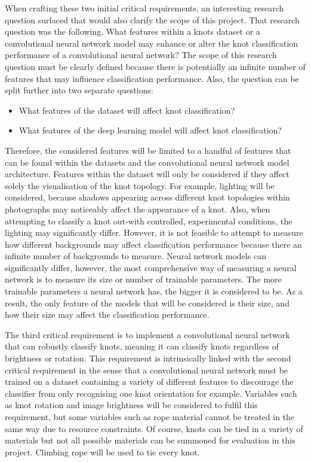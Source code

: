 \documentclass{l4proj}
\begin{document}
When crafting these two initial critical requirements, an interesting research question surfaced that would also clarify the scope of this project.
That research question was the following.
What features within a knots dataset or a convolutional neural network model may enhance or alter the knot classification performance of a convolutional neural network?
The scope of this research question must be clearly defined because there is potentially an infinite number of features that may influence classification performance.
Also, the question can be split further into two separate questions:
\begin{itemize}
	\item What features of the dataset will affect knot classification?
	\item What features of the deep learning model will affect knot classification?
\end{itemize}
Therefore, the considered features will be limited to a handful of features that can be found within the datasets and the convolutional neural network model architecture.
Features within the dataset will only be considered if they affect solely the visualisation of the knot topology.
For example, lighting will be considered, because shadows appearing across different knot topologies within photographs may noticeably affect the appearance of a knot.
Also, when attempting to classify a knot out-with controlled, experimental conditions, the lighting may significantly differ.
However, it is not feasible to attempt to measure how different backgrounds may affect classification performance because there an infinite number of backgrounds to measure.
Neural network models can significantly differ, however, the most comprehensive way of measuring a neural network is to measure its size or number of trainable parameters.
The more trainable parameters a neural network has, the bigger it is considered to be.
As a result, the only feature of the models that will be considered is their size, and how their size may affect the classification performance.

The third critical requirement is to implement a convolutional neural network that can robustly classify knots, meaning it can classify knots regardless of brightness or rotation.
This requirement is intrinsically linked with the second critical requirement in the sense that a convolutional neural network must be trained on a dataset containing a variety of different features to discourage the classifier from only recognising one knot orientation for example.
Variables such as knot rotation and image brightness will be considered to fulfil this requirement, but some variables such as rope material cannot be treated in the same way due to resource constraints.
Of course, knots can be tied in a variety of materials but not all possible materials can be summoned for evaluation in this project.
Climbing rope will be used to tie every knot. 
\end{document}
